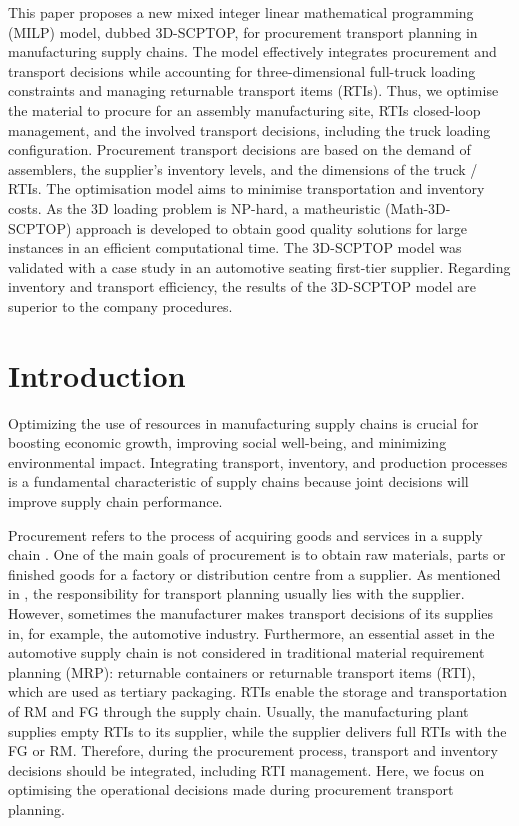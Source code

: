 

This paper proposes a new mixed integer linear mathematical programming (MILP) model, dubbed 3D-SCPTOP, for procurement transport planning in manufacturing supply chains. The model effectively integrates procurement and transport decisions while accounting for three-dimensional full-truck loading constraints and managing returnable transport items (RTIs). Thus, we optimise the material to procure for an assembly manufacturing site, RTIs closed-loop management,  and the involved transport decisions, including the truck loading configuration. Procurement transport decisions are based on the demand of assemblers, the supplier's inventory levels, and the dimensions of the truck / RTIs. The optimisation model aims to minimise transportation and inventory costs. As the 3D loading problem is NP-hard, a matheuristic (Math-3D-SCPTOP) approach is developed to obtain good quality solutions for large instances in an efficient computational time. The 3D-SCPTOP model was validated with a case study in an automotive seating first-tier supplier. Regarding inventory and transport efficiency, the results of the 3D-SCPTOP model are superior to the company procedures.

\section{Introduction}

Optimizing the use of resources in manufacturing supply chains is crucial for boosting economic growth, improving social well-being, and minimizing environmental impact. Integrating transport, inventory, and production processes is a fundamental characteristic of supply chains \autocite{Stadtler2015SupplyPlanning} because joint decisions will improve supply chain performance\autocite{Diaz-Madronero2017ADecisions}.

Procurement refers to the process of acquiring goods and services in a supply chain \autocite{Chopra2015SupplyOperation}. One of the main goals of procurement is to obtain raw materials, parts or finished goods for a factory or distribution centre from a supplier. As mentioned in \autocite{Fleischmann2015TransportDistribution}, the responsibility for transport planning usually lies with the supplier. However, sometimes the manufacturer makes transport decisions of its supplies in, for example, the automotive industry. Furthermore, an essential asset in the automotive supply chain is not considered in traditional material requirement planning (MRP): returnable containers or returnable transport items (RTI), which are used as tertiary packaging. RTIs enable the storage and transportation of RM and FG through the supply chain. Usually, the manufacturing plant supplies empty RTIs to its supplier, while the supplier delivers full RTIs with the FG or RM. Therefore, during the procurement process, transport and inventory decisions should be integrated, including RTI management. Here, we focus on optimising the operational decisions made during procurement transport planning.

